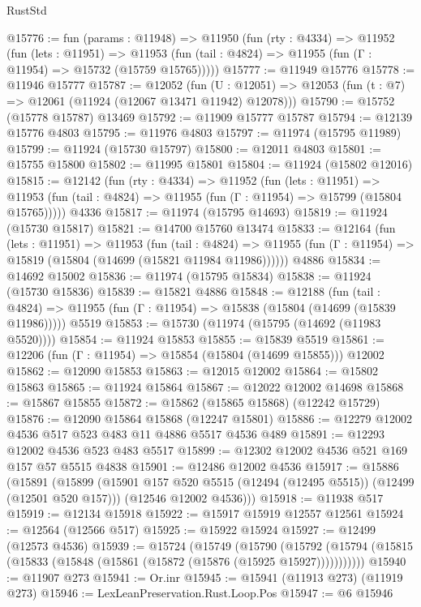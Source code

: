 \begin{lexlean}{RustStd}
\begin{coremodule}
@15776 := fun (params : @11948) =>
  @11950
    (fun (rty : @4334) =>
    @11952
      (fun (lets : @11951) =>
      @11953 (fun (tail : @4824) => @11955 (fun (Γ : @11954) => @15732 (@15759 @15765)))))
@15777 := @11949 @15776
@15778 := @11946 @15777
@15787 := @12052
    (fun (U : @12051) => @12053 (fun (t : @7) => @12061 (@11924 (@12067 @13471 @11942) @12078)))
@15790 := @15752 (@15778 @15787) @13469
@15792 := @11909 @15777 @15787
@15794 := @12139 @15776 @4803
@15795 := @11976 @4803
@15797 := @11974 (@15795 @11989)
@15799 := @11924 (@15730 @15797)
@15800 := @12011 @4803
@15801 := @15755 @15800
@15802 := @11995 @15801
@15804 := @11924 (@15802 @12016)
@15815 := @12142
    (fun (rty : @4334) =>
    @11952
      (fun (lets : @11951) =>
      @11953 (fun (tail : @4824) => @11955 (fun (Γ : @11954) => @15799 (@15804 @15765)))))
    @4336
@15817 := @11974 (@15795 @14693)
@15819 := @11924 (@15730 @15817)
@15821 := @14700 @15760 @13474
@15833 := @12164
    (fun (lets : @11951) =>
    @11953
      (fun (tail : @4824) =>
      @11955 (fun (Γ : @11954) => @15819 (@15804 (@14699 (@15821 @11984 @11986))))))
    @4886
@15834 := @14692 @15002
@15836 := @11974 (@15795 @15834)
@15838 := @11924 (@15730 @15836)
@15839 := @15821 @4886
@15848 := @12188
    (fun (tail : @4824) => @11955 (fun (Γ : @11954) => @15838 (@15804 (@14699 (@15839 @11986)))))
    @5519
@15853 := @15730 (@11974 (@15795 (@14692 (@11983 @5520))))
@15854 := @11924 @15853
@15855 := @15839 @5519
@15861 := @12206 (fun (Γ : @11954) => @15854 (@15804 (@14699 @15855))) @12002
@15862 := @12090 @15853
@15863 := @12015 @12002
@15864 := @15802 @15863
@15865 := @11924 @15864
@15867 := @12022 @12002 @14698
@15868 := @15867 @15855
@15872 := @15862 (@15865 @15868) (@12242 @15729)
@15876 := @12090 @15864 @15868 (@12247 @15801)
@15886 := @12279 @12002 @4536 @517 @523 @483 @11 @4886 @5517 @4536 @489
@15891 := @12293 @12002 @4536 @523 @483 @5517
@15899 := @12302 @12002 @4536 @521 @169 @157 @57 @5515 @4838
@15901 := @12486 @12002 @4536
@15917 := @15886
    (@15891
      (@15899
        (@15901 @157 @520 @5515 (@12494 (@12495 @5515)) (@12499 (@12501 @520 @157)))
        (@12546 @12002 @4536)))
@15918 := @11938 @517
@15919 := @12134 @15918
@15922 := @15917 @15919 @12557 @12561
@15924 := @12564 (@12566 @517)
@15925 := @15922 @15924
@15927 := @12499 (@12573 @4536)
@15939 := @15724
    (@15749
      (@15790
        (@15792 (@15794 (@15815 (@15833 (@15848 (@15861 (@15872 (@15876 (@15925 @15927)))))))))))
@15940 := @11907 @273
@15941 := Or.inr
@15945 := @15941 (@11913 @273) (@11919 @273)
@15946 := LexLeanPreservation.Rust.Loop.Pos
@15947 := @6 @15946

\end{coremodule}
\end{lexlean}
